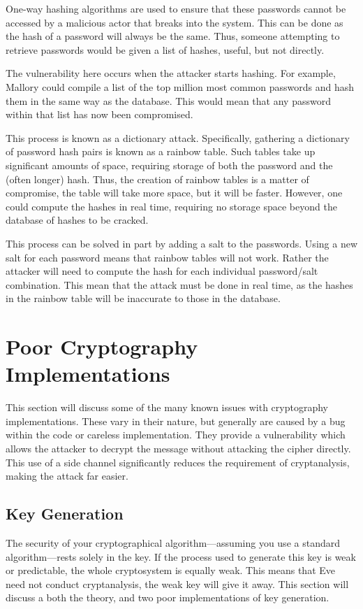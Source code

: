 		One-way hashing algorithms are used to ensure that these passwords cannot be accessed by a malicious actor that breaks into the system. 
		This can be done as the hash of a password will always be the same. 
		Thus, someone attempting to retrieve passwords would be given a list of hashes, useful, but not directly. 

		The vulnerability here occurs when the attacker starts hashing. 
		For example, Mallory could compile a list of the top million most common passwords and hash them in the same way as the database. 
		This would mean that any password within that list has now been compromised. 

		This process is known as a dictionary attack. 
		Specifically, gathering a dictionary of password hash pairs is known as a rainbow table. 
		Such tables take up significant amounts of space, requiring storage of both the password and the (often longer) hash. 
		Thus, the creation of rainbow tables is a matter of compromise, the table will take more space, but it will be faster. 
		However, one could compute the hashes in real time, requiring no storage space beyond the database of hashes to be cracked.

		This process can be solved in part by adding a salt to the passwords. 
		Using a new salt for each password means that rainbow tables will not work. 
		Rather the attacker will need to compute the hash for each individual password/salt combination. 
		This mean that the attack must be done in real time, as the hashes in the rainbow table will be inaccurate to those in the database. 
	\section{Poor Cryptography Implementations}
		This section will discuss some of the many known issues with cryptography implementations. 
		These vary in their nature, but generally are caused by a bug within the code or careless implementation. 
		They provide a vulnerability which allows the attacker to decrypt the message without attacking the cipher directly. 
		This use of a side channel significantly reduces the requirement of cryptanalysis, making the attack far easier. 
		\subsection{Key Generation}
			The security of your cryptographical algorithm---assuming you use a standard algorithm---rests solely in the key. 
			If the process used to generate this key is weak or predictable, the whole cryptosystem is equally weak. 
			This means that Eve need not conduct cryptanalysis, the weak key will give it away. 
			This section will discuss a both the theory, and two poor implementations of key generation. 

